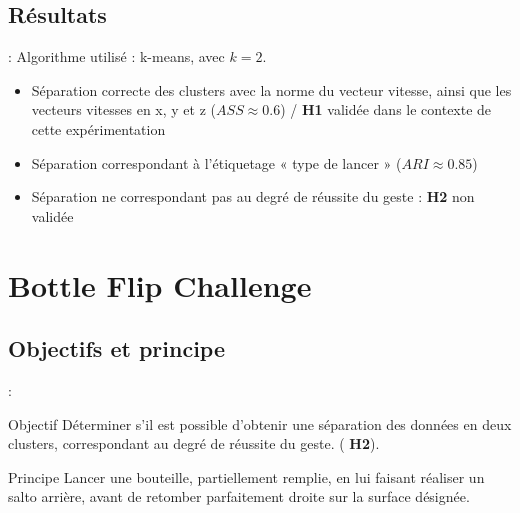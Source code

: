 \documentclass[svgnames]{beamer}
\begin{document}
	\subsection{Résultats}
	\begin{frame}{\secname : \subsecname}
	Algorithme utilisé : k-means, avec $k=2$.
	\begin{itemize}
		\item Séparation correcte des clusters avec la norme du vecteur vitesse, ainsi que les vecteurs vitesses en x, y et z ($ASS \approx 0.6$) / \textbf{H1} validée dans le contexte de cette expérimentation
		\item Séparation correspondant à l'étiquetage « type de lancer » ($ARI \approx 0.85$)
		\item Séparation ne correspondant pas au degré de réussite du geste : \textbf{H2} non validée
	\end{itemize}
		
	\end{frame}


	\section{Bottle Flip Challenge}
	\subsection{Objectifs et principe}
	\begin{frame}{\secname : \subsecname}
		\begin{block}{Objectif}
			 Déterminer s'il est possible d'obtenir une séparation des données en deux clusters, correspondant au degré de réussite du geste. ( \textbf{H2}).
		\end{block}
	
		\begin{block}{Principe}
			Lancer une bouteille, partiellement remplie, en lui faisant réaliser un salto arrière, avant de retomber parfaitement droite sur la surface désignée.
		\end{block}
		
	\end{frame}
	
\end{document}
